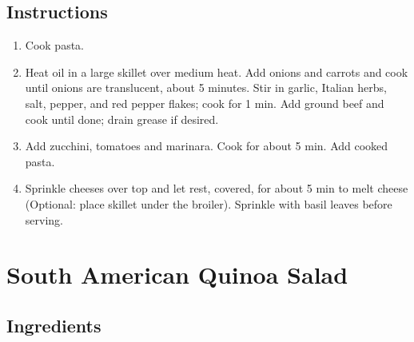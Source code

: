 \documentclass[ansiapaper,10pt,english]{sphinxmanual}
\begin{document}
\section{Instructions}
\label{\detokenize{Skillet_Las:instructions}}\begin{enumerate}
\item {} 
Cook pasta.

\item {} 
Heat oil in a large skillet over medium heat. Add onions and carrots and cook until onions are translucent, about 5 minutes. Stir in garlic, Italian herbs, salt, pepper, and red pepper flakes; cook for 1 min. Add ground beef and cook until done; drain grease if desired.

\item {} 
Add zucchini, tomatoes and marinara. Cook for about 5 min. Add cooked pasta.

\item {} 
Sprinkle cheeses over top and let rest, covered, for about 5 min to melt cheese (Optional: place skillet under the broiler). Sprinkle with basil leaves before serving.

\end{enumerate}


\chapter{South American Quinoa Salad}
\label{\detokenize{SA_Quinoa_Salad:south-american-quinoa-salad}}\label{\detokenize{SA_Quinoa_Salad::doc}}

\section{Ingredients}
\label{\detokenize{SA_Quinoa_Salad:ingredients}}
%
\begin{sphinxVerbatim}[commandchars=\\\{\}]
  

     

    

   

   

  

    

    

    

   

    
\end{sphinxVerbatim}
\end{document}
